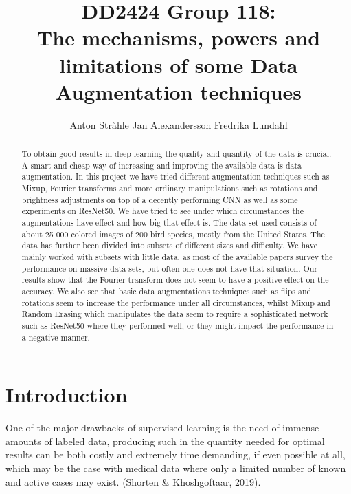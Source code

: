 \documentclass{article}
\title{DD2424 Group 118: \\ The mechanisms, powers and limitations of some Data Augmentation techniques}
\author{%
  Anton Stråhle \And Jan Alexandersson \And Fredrika Lundahl}
\begin{document}
	
\maketitle

\begin{abstract}

To obtain good results in deep learning the quality and quantity of the data is crucial. A smart and cheap way of increasing and 
improving the available data is data augmentation. In this project we have tried different 
augmentation techniques such as Mixup, Fourier transforms and more ordinary manipulations 
such as rotations and brightness adjustments on top of a decently performing CNN as well as some experiments on 
ResNet50. We have tried to see under which circumstances the augmentations have effect and how big that 
effect is. The data set used consists of about 25 000 colored images of 200 bird species, mostly from the United States. 
The data has further been divided into subsets of different sizes and difficulty. We have mainly worked with subsets with little data, as most of the available papers survey the performance on massive data sets, but often one does not have that situation.
Our results show that the 
Fourier transform does not seem to have a positive effect on the accuracy. 
We also see that basic data augmentations techniques such as flips and rotations seem to increase the performance under all circumstances, whilst Mixup and Random Erasing which manipulates the data seem to require a sophisticated network such as ResNet50 where they performed well, or they might impact the performance in a negative manner.


\end{abstract}

\section{Introduction}

% 

One of the major drawbacks of supervised learning is the need of immense amounts of labeled data, producing such in the quantity needed for optimal results can be both costly and extremely time demanding, if even possible at all, which may be the case with medical data where only a limited number of known and active cases may exist.  (Shorten \& Khoshgoftaar, 2019). 
\end{document}
